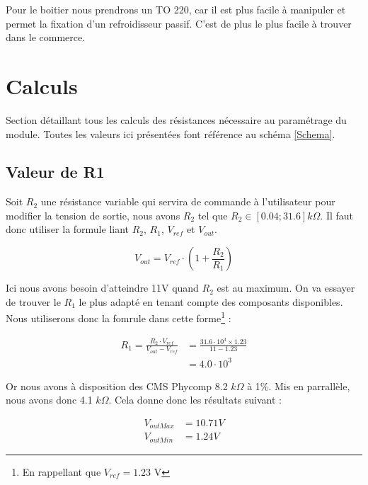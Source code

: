 \documentclass[12pt]{article}
\begin{document}
Pour le boitier nous prendrons un TO 220, car il est plus facile à manipuler et permet la fixation d'un refroidisseur
passif. C'est de plus le plus facile à trouver dans le commerce.




\newpage
\section{Calculs}\label{sectionCalculs}

Section détaillant tous les calculs des résistances nécessaire au paramétrage du module. Toutes les valeurs ici présentées
font référence au schéma \ref{Schema}.

\subsection{Valeur de R1}

Soit $R_2$ une résistance variable qui servira de commande à l'utilisateur pour modifier la tension de sortie, nous
avons $R_2$ tel que $R_2 \in [0.04 ; 31.6]  k\Omega$. Il faut donc utiliser la formule liant $R_2$, $R_1$, $V_{ref}$ et $V_{out}$.

\begin{equation}
	\boxed{V_{out} = V_{ref} \cdot (1 + \frac{R_2}{R_1})}
\end{equation}

Ici nous avons besoin d'atteindre 11V quand $R_2$ est au maximum. On va essayer de trouver le $R_1$ le plus
adapté en tenant compte des composants disponibles.
Nous utiliserons donc la fomrule dans cette forme\footnote{En rappellant que $V_{ref} = 1.23$ V} :

\begin{equation}
	\begin{split}
		R_1 = \frac{R_2 \cdot V_{ref}}{V_{out} - V_{ref}} & = \frac{31.6 \cdot 10^3 \times 1.23}{11 - 1.23} \\
								  & = 4.0 \cdot 10^3
	\end{split}
\end{equation}

Or nous avons à disposition des CMS Phycomp 8.2 $k\Omega$ à 1\%. Mis en parrallèle, nous avons donc 4.1 $k\Omega$. Cela
donne donc les résultats suivant :

\begin{align}
	V_{out Max}& = 10.71 V \\
	V_{out Min}& = 1.24 V
\end{align}
\end{document}
